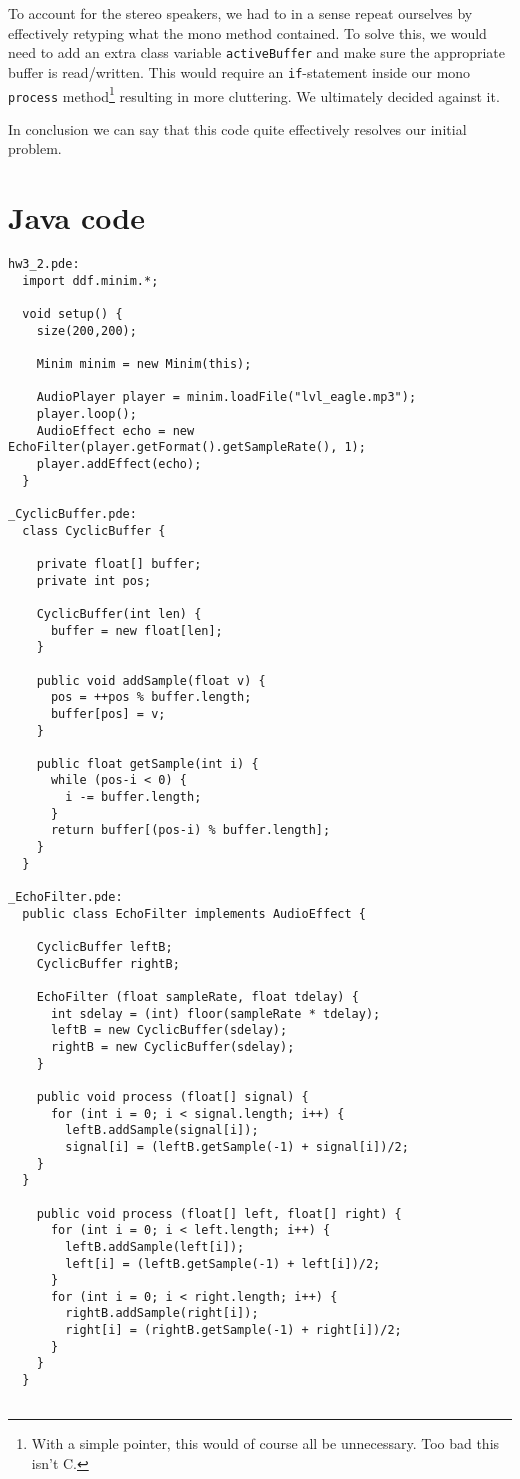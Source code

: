 \documentclass[11pt]{amsart}
\begin{document}
To account for the stereo speakers, we had to in a sense repeat ourselves by effectively retyping what the mono method contained. To solve this, we would need to add an extra class variable \texttt{activeBuffer} and make sure the appropriate buffer is read/written. This would require an \texttt{if}-statement inside our mono \texttt{process} method\footnote{With a simple pointer, this would of course all be unnecessary. Too bad this isn't C.} resulting in more cluttering. We ultimately decided against it.

In conclusion we can say that this code quite effectively resolves our initial problem.

\appendix
\section{Java code}

\begin{verbatim}
hw3_2.pde:
  import ddf.minim.*;

  void setup() {
    size(200,200);

    Minim minim = new Minim(this);
  
    AudioPlayer player = minim.loadFile("lvl_eagle.mp3");
    player.loop();
    AudioEffect echo = new EchoFilter(player.getFormat().getSampleRate(), 1);
    player.addEffect(echo);
  }

_CyclicBuffer.pde:
  class CyclicBuffer {

    private float[] buffer;
    private int pos;
  
    CyclicBuffer(int len) {
      buffer = new float[len];
    }
  
    public void addSample(float v) {
      pos = ++pos % buffer.length;
      buffer[pos] = v;
    }
  
    public float getSample(int i) {
      while (pos-i < 0) {
        i -= buffer.length;
      }
      return buffer[(pos-i) % buffer.length];
    }
  }

_EchoFilter.pde:
  public class EchoFilter implements AudioEffect {

    CyclicBuffer leftB;
    CyclicBuffer rightB;
  
    EchoFilter (float sampleRate, float tdelay) {
      int sdelay = (int) floor(sampleRate * tdelay);
      leftB = new CyclicBuffer(sdelay);
      rightB = new CyclicBuffer(sdelay);
    }
  
    public void process (float[] signal) {
      for (int i = 0; i < signal.length; i++) {
        leftB.addSample(signal[i]);
        signal[i] = (leftB.getSample(-1) + signal[i])/2;
    }
  }
  
    public void process (float[] left, float[] right) {
      for (int i = 0; i < left.length; i++) {
        leftB.addSample(left[i]);
        left[i] = (leftB.getSample(-1) + left[i])/2;
      }
      for (int i = 0; i < right.length; i++) {
        rightB.addSample(right[i]);
        right[i] = (rightB.getSample(-1) + right[i])/2;
      }
    }
  }


\end{verbatim}
\end{document}

